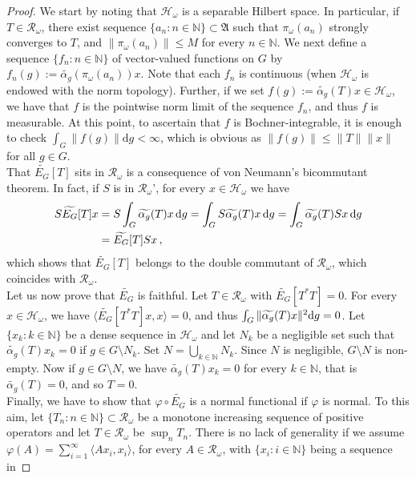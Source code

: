 \documentclass[12pt]{amsart}
\numberwithin{equation}{section}
\def\ch{{\mathcal H}}
\def\ga{{\mathfrak A}} \def\gpa{{\mathfrak a}}
\def\bn{{\mathbb N}}
\def\a{\alpha}
\def\om{\omega} \def\Om{\Omega}
\theoremstyle{definition}
\begin{document}
\begin{proof}
We start by noting that $\ch_\om$ is a separable Hilbert space. In particular, if 
$T\in\mathcal{R}_\om$, there exist  sequence $\{a_n: n\in\mathbb{N}\}\subset\ga$ such that 
$\pi_\om(a_n)$ strongly converges to $T$, and $\|\pi_\om(a_n)\|\leq M$ for every $n\in\mathbb{N}$. We next define a sequence $\{f_n: n\in\mathbb{N}\}$ of vector-valued functions on $G$
by $f_n(g):=\widetilde{\a_g}(\pi_\om(a_n))x$. Note that each $f_n$ is continuous (when $\ch_\om$ is endowed with the norm topology).
Further, if we set $f(g):= \widetilde{\a_g}(T)x\in \ch_\om$, we have that $f$ is the pointwise norm limit of the sequence $f_n$, and thus
$f$ is measurable.  At this point, to ascertain that $f$ is Bochner-integrable, it is enough to check
$\int_G \|f(g)\| \textrm{d}g<\infty$, which is obvious as $ \|f(g)\|\leq \|T\|\|x\|$ for all $g\in G$.\\
That $\widetilde {E_G}[T]$ sits in $\mathcal{R}_\om$ is a
consequence of von Neumann’s bicommutant theorem. In fact, if $S$ is in $\mathcal{R}_\om’$, for every
$x\in\ch_\om$ we have
\begin{align*}
S\widetilde {E_G}[T]x&=S\int_G \widetilde{\a_g}(T)x\,{\rm d}g=\int_G S \widetilde{\a_g}(T)x\,{\rm d}g
=\int_G  \widetilde{\a_g}(T)Sx\,{\rm d}g\\
&=\widetilde {E_G}[T]Sx\,,
\end{align*}
which shows that $\widetilde {E_G}[T]$ belongs to the double commutant of $\mathcal{R}_\om$, which coincides with
$\mathcal{R}_\om$.\\
Let us now prove that $\widetilde {E_G}$ is faithful.  Let $T\in\mathcal{R}_\om$ with $\widetilde {E_G}[T^*T]=0$.
For every $x\in \ch_\om$, we have $\langle \widetilde {E_G}[T^*T]x, x \rangle=0$, and thus
$\int_G \| \widetilde{\a_g}(T) x\|^2{\rm d}g=0$. Let $\{x_k: k\in\bn\}$ be a dense sequence in
$\ch_\om$ and let $N_k$ be a negligible set such that $\widetilde{\a_g}(T) x_k=0$ if $g\in G\setminus N_k$.
Set $N=\bigcup_{k\in\bn} N_k$. Since $N$ is negligible, $G\setminus N$ is non-empty. Now
if $g\in G\setminus N$, we have $\widetilde{\a_g}(T) x_k=0$ for every $k\in\bn$, that is $\widetilde{\a_g}(T)=0$, and so
$T=0$.\\
Finally, we have to show that
$\varphi\circ\widetilde{E_G}$ is a normal functional if $\varphi$ is normal.
To this aim, let
$\{T_n: n\in\bn\}\subset\mathcal{R}_\om$ be a monotone increasing sequence of positive operators and let $T\in\mathcal{R}_\om$ be
$\sup_n T_n$. 
There is no lack of generality if we assume
$\varphi(A)=\sum_{i=1}^\infty \langle A x_i, x_i \rangle$, for every $A\in\mathcal{R}_\om$,  with $\{x_i: i\in\bn\}$ being a sequence in

\end{proof}
\end{document}
